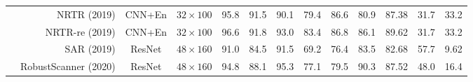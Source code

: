 \documentclass[10pt,journal,compsoc]{IEEEtran}
\begin{document}
\begin{table*}[t]
{\begin{tabular}{c|r|c|c|ccc|ccc|c|cc}
                        & NRTR \cite{Sheng2019nrtr} (2019)   & CNN+En    & $32\times100$          & 95.8          & 91.5          & 90.1          &     79.4          &   86.6            &     80.9          &                                                       87.38                      & 31.7                                                                    & 33.2                                                              \\
                        & NRTR-re\cite{Sheng2019nrtr} (2019)& CNN+En & $32\times100$            & 96.6          & 91.8          & 93.0          & 83.4          & 86.8          & 86.1          & 89.62                                                                       & 31.7                                                                    & 33.2                                                              \\
                       
                        & SAR \cite{li2019sar} (2019)& ResNet     & $48\times160$           & 91.0          & 84.5          & 91.5          & 69.2          & 76.4          & 83.5          & 82.68                                                                       & 57.7                                                                    & 9.62                                                             \\
                        & RobustScanner \cite{yue2020robustscanner} (2020)& ResNet      & $48\times160$   & 94.8          & 88.1          & 95.3          & 77.1          & 79.5          & 90.3          & 87.52                                                                       &                 48.0                                                        &  16.4                                                                    \\
                        

\end{tabular}}
\end{table*}
\end{document}
